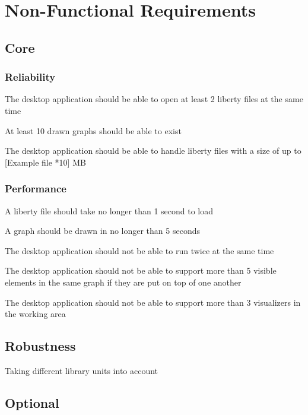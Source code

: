 \documentclass[10pt,a4paper]{report}
\begin{document}
\section{Non-Functional Requirements}
\subsection{Core}
\subsubsection{Reliability}
\begin{NFR-Rel}
    \item The desktop application should be able to open at least 2 liberty files at the same time
    \item At least 10 drawn graphs should be able to exist
    \item The desktop application should be able to handle liberty files with a size of up to [Example file *10] MB
\end{NFR-Rel}

\subsubsection{Performance}
\begin{NFR-Perf}
    \item A liberty file should take no longer than 1 second to load
    \item A graph should be drawn in no longer than 5 seconds
    \item The desktop application should not be able to run twice at the same time
    \item The desktop application should not be able to support more than 5 visible elements in the same graph if they are put on top of one another
    \item  The desktop application should not be able to support more than 3 visualizers in the working area
\end{NFR-Perf}

\subsection{Robustness}
\begin{NFR-Rob}
    \item Taking different library units into account
\end{NFR-Rob}

\subsection{Optional}
\end{document}
